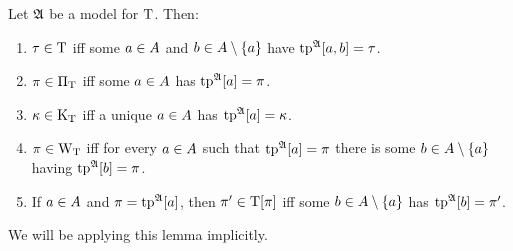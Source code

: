 \begin{lemma}\label{rem:type-char}
Let $\mathfrak{A}$ be a model for $\mathrm{T}$.
Then:
\begin{enumerate}
  \item
  $\tau\in\mathrm{T}$ iff
  some $a\in A$ and $b\in A\setminus\left\{a\right\}$
  have $\operatorname{tp}^{\mathfrak{A}}[a,b] = \tau$.
  \item
  $\pi\in{\Pi}_{\mathrm{T}}$ iff
  some $a\in A$ has $\operatorname{tp}^{\mathfrak{A}}[a] = \pi$.
  \item
  $\kappa\in{\mathrm{K}}_{\mathrm{T}}$ iff
  a unique $a\in A$ has $\operatorname{tp}^{\mathfrak{A}}[a] = \kappa$.
  \item
  $\pi\in{\mathrm{W}}_{\mathrm{T}}$ iff
  for every $a\in A$ such that $\operatorname{tp}^{\mathfrak{A}}[a] = \pi$
  there is some $b\in A\setminus\left\{a\right\}$ having $\operatorname{tp}^{\mathfrak{A}}[b] = \pi$.
  \item
  If $a\in A$ and $\pi = \operatorname{tp}^{\mathfrak{A}}[a]$, then
  ${\pi'}\in\mathrm{T}[\pi]$ iff
  some $b\in A\setminus\left\{a\right\}$ has $\operatorname{tp}^{\mathfrak{A}}[b] = {\pi'}$.
\end{enumerate}
We will be applying this lemma implicitly.
\end{lemma}

